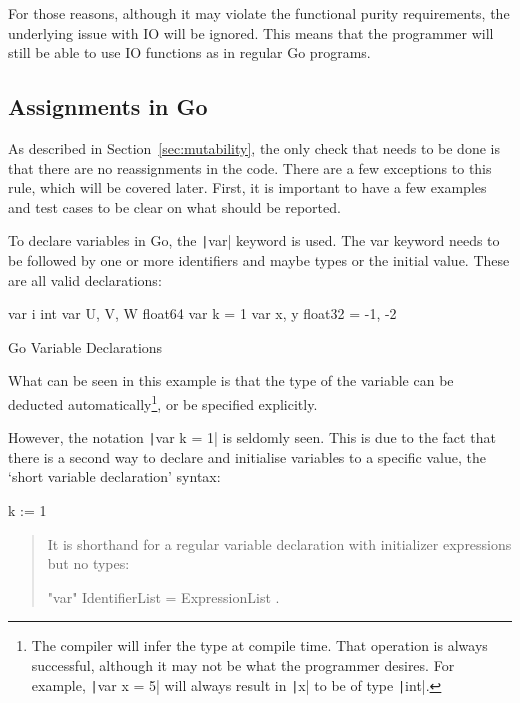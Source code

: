 For those reasons, although it may violate the functional purity requirements,
the underlying issue with IO will be ignored. This means that the programmer
will still be able to use IO functions as in regular Go programs.

\subsection{Assignments in Go}

As described in Section~\ref{sec:mutability}, the only check that needs
to be done is that there are no reassignments in the code. There are a few
exceptions to this rule, which will be covered later. First, it is important to have
a few examples and test cases to be clear on what should be reported.

To declare variables in Go, the \texttt|var| keyword is used.
The var keyword needs to be followed by one or more identifiers and maybe
types or the initial value. These are all valid declarations:

\begin{listing}
	\begin{gocode}
var i int
var U, V, W float64
var k = 1
var x, y float32 = -1, -2
	\end{gocode}
	\caption{Go Variable Declarations}
\end{listing}
What can be seen in this example is that the type of the variable can be
deducted automatically\footnote{The compiler will infer the type at compile
time. That operation is always successful, although it may not be what
the programmer desires. For example, \texttt|var x = 5| will
always result in \texttt|x| to be of type \texttt|int|.},
or be specified explicitly.

However, the notation \texttt|var k = 1| is seldomly seen. This
is due to the fact that there is a second way to declare and initialise
variables to a specific value, the `short variable declaration' syntax:

\begin{gocode}
k := 1
\end{gocode}
\begin{quote}
It is shorthand for a regular variable declaration with initializer expressions but no types:

\begin{bnfcode}
"var" IdentifierList = ExpressionList .
\end{bnfcode}
\autocite{short-hand-decl}
\end{quote}

